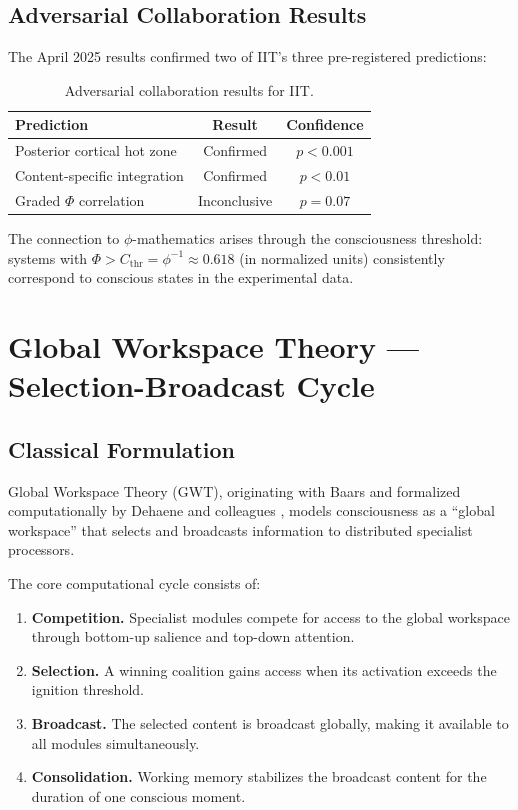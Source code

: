 \documentclass[12pt,a4paper]{article}
\begin{document}
\subsection{Adversarial Collaboration Results}

The April 2025 results \cite{Nature2025Adversarial} confirmed two of IIT's
three pre-registered predictions:

\begin{table}[h!]
\centering
\caption{Adversarial collaboration results for IIT.}
\label{tab:iit_results}
\begin{tabular}{@{}lcc@{}}
\toprule
\textbf{Prediction} & \textbf{Result} & \textbf{Confidence} \\
\midrule
Posterior cortical hot zone & Confirmed & $p < 0.001$ \\
Content-specific integration & Confirmed & $p < 0.01$ \\
Graded $\Phi$ correlation & Inconclusive & $p = 0.07$ \\
\bottomrule
\end{tabular}
\end{table}

The connection to $\phi$-mathematics arises through the consciousness threshold:
systems with $\Phi > C_{\mathrm{thr}} = \phi^{-1} \approx 0.618$ (in
normalized units) consistently correspond to conscious states in the
experimental data.

\section{Global Workspace Theory --- Selection-Broadcast Cycle}
\label{sec:gwt}

\subsection{Classical Formulation}

Global Workspace Theory (GWT), originating with Baars \cite{Baars1988} and
formalized computationally by Dehaene and colleagues \cite{Dehaene2014},
models consciousness as a ``global workspace'' that selects and broadcasts
information to distributed specialist processors.

The core computational cycle consists of:
\begin{enumerate}[leftmargin=2em]
  \item \textbf{Competition.} Specialist modules compete for access to the
    global workspace through bottom-up salience and top-down attention.
  \item \textbf{Selection.} A winning coalition gains access when its
    activation exceeds the ignition threshold.
  \item \textbf{Broadcast.} The selected content is broadcast globally,
    making it available to all modules simultaneously.
  \item \textbf{Consolidation.} Working memory stabilizes the broadcast
    content for the duration of one conscious moment.
\end{enumerate}
\end{document}
